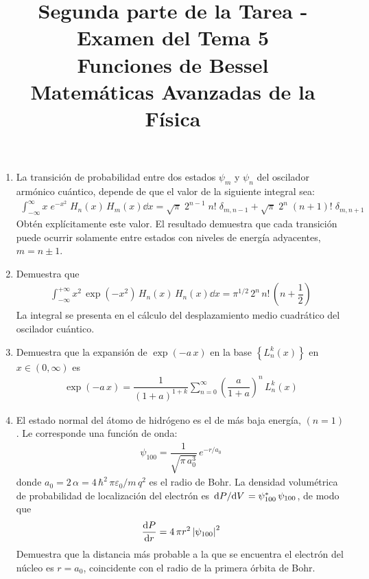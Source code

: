 
\author{}
\title{Segunda parte de la Tarea - Examen del Tema 5  \\ \large{Funciones de Bessel \\ Matemáticas Avanzadas de la Física}} \vspace{-1.5\baselineskip}
\date{ }

\vspace{-4cm}
\renewcommand\labelenumii{\theenumi.{\arabic{enumii})}}
\maketitle
\fontsize{14}{14}\selectfont
\begin{enumerate}
\item La transición de probabilidad entre dos estados $\psi_{m}$ y $\psi_{n}$ del oscilador armónico cuántico, depende de que el valor de la siguiente integral sea:
\begin{align*}
\int_{-\infty}^{\infty} x \; e^{-x^{2}} \; H_{n} (x) \, H_{m}(x) \dd{x} = \sqrt{\pi} \; 2^{n-1} \; n! \; \delta_{m,n-1} + \sqrt{\pi} \; 2^{n} \; (n+1)! \; \delta_{m,n+1}
\end{align*}
Obtén explícitamente este valor. El resultado demuestra que cada transición puede ocurrir solamente entre estados con niveles de energía adyacentes, $m = n \pm 1$.
\item Demuestra que
\begin{align*}
\int_{-\infty}^{+\infty} x^{2} \, \exp \left( -x^{2} \right) \, H_{n} (x) \, H_{n} (x) \dd{x} = \pi^{1/2} \, 2^{n} \, n! \, \left( n + \dfrac{1}{2} \right)
\end{align*}
La integral se presenta en el cálculo del desplazamiento medio cuadrático del oscilador cuántico.
\item Demuestra que la expansión de $\exp(-a \, x)$ en la base $\left\{ L_{n}^{k} (x) \right\}$ en $ x \in (0, \infty)$ es
\begin{align*}
\exp(-a \, x) = \dfrac{1}{(1 + a)^{1+k}} \sum_{n=0}^{\infty} \left( \dfrac{a}{1 + a} \right)^{n} \, L_{n}^{k} (x)
\end{align*}
\item El estado normal del átomo de hidrógeno es el de más baja energía, $(n = 1)$. Le corresponde una función de onda:
\begin{align*}
\psi_{100} = \dfrac{1}{\sqrt{\pi \, a_{0}^{3}}} \, e^{-r/a_{0}}\end{align*}
donde $a_{0} = 2 \, \alpha = 4 \, \hbar^{2} \, \pi \varepsilon_{0}/ m \,q^{2}$ es el radio de Bohr. La densidad volumétrica de probabilidad de localización del electrón es $\dv*{P}{V} = \psi_{100}^{*} \, \psi_{100}$, de modo que 
\begin{align*}
\dv{P}{r} = 4 \, \pi r^{2} \, \abs{\psi_{100}}^{2}
\end{align*}
Demuestra que la distancia más probable a la que se encuentra el electrón del núcleo es $r = a_{0}$, coincidente con el radio de la primera órbita de Bohr.
\end{enumerate}
